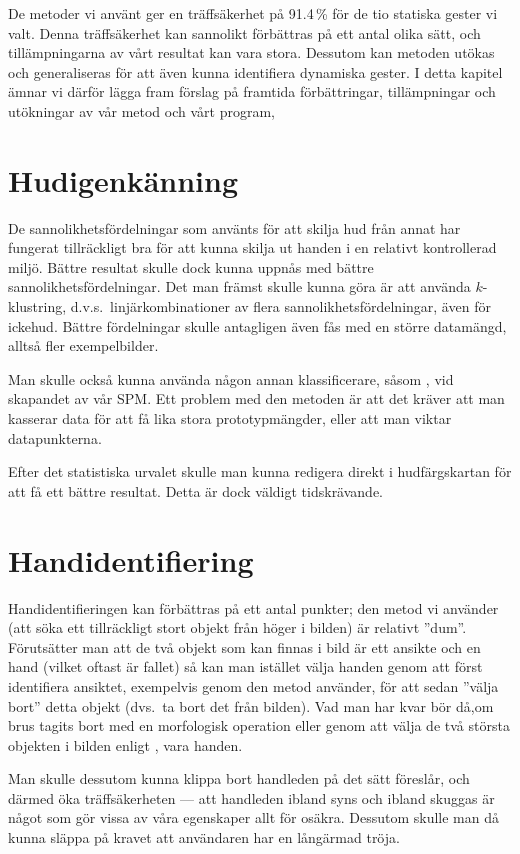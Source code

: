\documentclass[../rapport_MVEX01-11-05]{subfiles}
\begin{document}
De metoder vi använt ger en träffsäkerhet på 91.4\,\% för de tio statiska
gester vi valt. Denna träffsäkerhet kan sannolikt förbättras på ett antal
olika sätt, och tillämpningarna av vårt resultat kan vara stora. Dessutom
kan metoden utökas och generaliseras för att även kunna identifiera
dynamiska gester. I detta kapitel ämnar vi därför lägga fram förslag på framtida
förbättringar, tillämpningar och utökningar av vår metod och vårt program,

\section{Hudigenkänning}
De sannolikhetsfördelningar som använts för att skilja hud från annat
har fungerat tillräckligt bra för att kunna skilja ut handen i en
relativt kontrollerad miljö. Bättre resultat skulle dock kunna uppnås
med bättre sannolikhetsfördelningar. Det man främst skulle kunna göra
är att använda $k$-klustring, d.v.s.~linjärkombinationer av flera
sannolikhetsfördelningar, även för ickehud. Bättre fördelningar skulle
antagligen även fås med en större datamängd, alltså fler
exempelbilder.

Man skulle också kunna använda någon annan klassificerare, såsom \knn,
vid skapandet av vår SPM. Ett problem med den metoden är att det
kräver att man kasserar data för att få lika stora prototypmängder,
eller att man viktar datapunkterna.

Efter det statistiska urvalet skulle man kunna redigera direkt i
hudfärgskartan för att få ett bättre resultat. Detta är dock väldigt
tidskrävande.

\section{Handidentifiering}
Handidentifieringen kan förbättras på ett antal punkter;
den metod vi använder (att söka ett tillräckligt stort objekt från höger i
bilden) är relativt ''dum''. Förutsätter man att de två objekt som kan finnas
i bild är ett ansikte och en hand (vilket oftast är fallet) så kan man
istället välja handen genom att först identifiera ansiktet, exempelvis genom
den metod  använder, för att sedan ''välja bort'' detta
objekt (dvs.~ta bort det från bilden). Vad man har kvar bör då,om brus tagits
bort med en morfologisk operation eller genom att välja de två största
objekten i bilden enligt , vara handen.

Man skulle dessutom kunna klippa bort handleden på det sätt
 föreslår, och därmed öka träffsäkerheten --- att
handleden ibland syns och ibland skuggas är något som gör vissa av våra
egenskaper allt för osäkra. Dessutom skulle man då kunna släppa på kravet
att användaren har en långärmad tröja.
\end{document}
